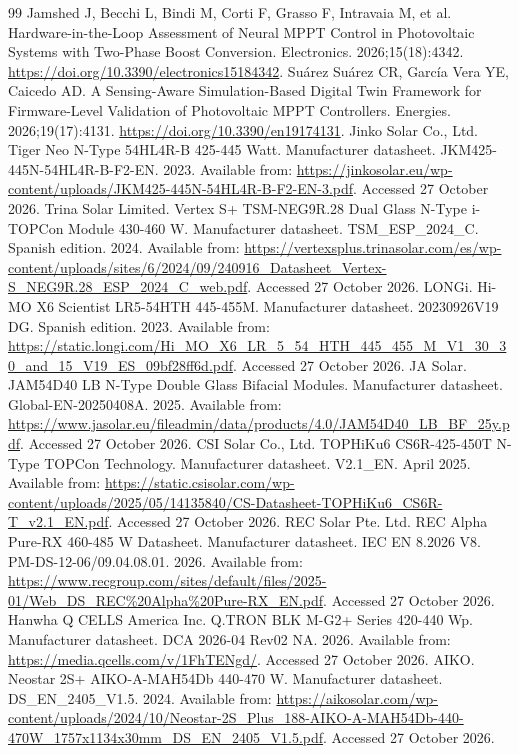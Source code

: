\documentclass[Acad.Energy.,researcharticle,9pt,twoside,oneauthor]{Definitions/jams_academia}
\begin{document}
\begin{thebibliography}{99}
 Jamshed J, Becchi L, Bindi M, Corti F, Grasso F, Intravaia M, et al. Hardware-in-the-Loop Assessment of Neural MPPT Control in Photovoltaic Systems with Two-Phase Boost Conversion. Electronics. 2026;15(18):4342. \url{https://doi.org/10.3390/electronics15184342}.
 Suárez Suárez CR, García Vera YE, Caicedo AD. A Sensing-Aware Simulation-Based Digital Twin Framework for Firmware-Level Validation of Photovoltaic MPPT Controllers. Energies. 2026;19(17):4131. \url{https://doi.org/10.3390/en19174131}.
 Jinko Solar Co., Ltd. Tiger Neo N-Type 54HL4R-B 425-445 Watt. Manufacturer datasheet. JKM425-445N-54HL4R-B-F2-EN. 2023. Available from: \url{https://jinkosolar.eu/wp-content/uploads/JKM425-445N-54HL4R-B-F2-EN-3.pdf}. Accessed 27 October 2026.
 Trina Solar Limited. Vertex S+ TSM-NEG9R.28 Dual Glass N-Type i-TOPCon Module 430-460 W. Manufacturer datasheet. TSM\_ESP\_2024\_C. Spanish edition. 2024. Available from: \url{https://vertexsplus.trinasolar.com/es/wp-content/uploads/sites/6/2024/09/240916_Datasheet_Vertex-S_NEG9R.28_ESP_2024_C_web.pdf}. Accessed 27 October 2026.
 LONGi. Hi-MO X6 Scientist LR5-54HTH 445-455M. Manufacturer datasheet. 20230926V19 DG. Spanish edition. 2023. Available from: \url{https://static.longi.com/Hi_MO_X6_LR_5_54_HTH_445_455_M_V1_30_30_and_15_V19_ES_09bf28ff6d.pdf}. Accessed 27 October 2026.
 JA Solar. JAM54D40 LB N-Type Double Glass Bifacial Modules. Manufacturer datasheet. Global-EN-20250408A. 2025. Available from: \url{https://www.jasolar.eu/fileadmin/data/products/4.0/JAM54D40_LB_BF_25y.pdf}. Accessed 27 October 2026.
 CSI Solar Co., Ltd. TOPHiKu6 CS6R-425-450T N-Type TOPCon Technology. Manufacturer datasheet. V2.1\_EN. April 2025. Available from: \url{https://static.csisolar.com/wp-content/uploads/2025/05/14135840/CS-Datasheet-TOPHiKu6_CS6R-T_v2.1_EN.pdf}. Accessed 27 October 2026.
 REC Solar Pte. Ltd. REC Alpha Pure-RX 460-485 W Datasheet. Manufacturer datasheet. IEC EN 8.2026 V8. PM-DS-12-06/09.04.08.01. 2026. Available from: \url{https://www.recgroup.com/sites/default/files/2025-01/Web_DS_REC%20Alpha%20Pure-RX_EN.pdf}. Accessed 27 October 2026.
 Hanwha Q CELLS America Inc. Q.TRON BLK M-G2+ Series 420-440 Wp. Manufacturer datasheet. DCA 2026-04 Rev02 NA. 2026. Available from: \url{https://media.qcells.com/v/1FhTENgd/}. Accessed 27 October 2026.
 AIKO. Neostar 2S+ AIKO-A-MAH54Db 440-470 W. Manufacturer datasheet. DS\_EN\_2405\_V1.5. 2024. Available from: \url{https://aikosolar.com/wp-content/uploads/2024/10/Neostar-2S_Plus_188-AIKO-A-MAH54Db-440-470W_1757x1134x30mm_DS_EN_2405_V1.5.pdf}. Accessed 27 October 2026.

\end{thebibliography}
\end{document}
